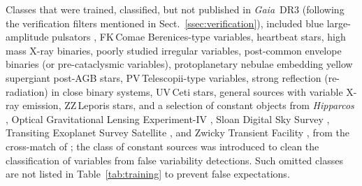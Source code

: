 \documentclass[longauth]{aa}
\def\gdr3{\textit{Gaia}~DR3\xspace}
\begin{document}
Classes that were trained, classified, but not published in \gdr3 (following the verification filters mentioned in Sect.~\ref{ssec:verification}), included blue large-amplitude pulsators \citep[BLAP,][]{2017NatAs...1E.166P}, FK\,Comae Berenices-type variables, heartbeat stars, high mass X-ray binaries, poorly studied irregular variables, post-common envelope binaries (or pre-cataclysmic variables), protoplanetary nebulae embedding yellow supergiant post-AGB stars, PV\,Telescopii-type variables, strong reflection (re-radiation) in close binary systems, UV\,Ceti stars, general sources with variable X-ray emission, ZZ\,Leporis stars, and a selection of constant objects from \textit{Hipparcos} \citep{1997ESASP1200.....E}, Optical Gravitational Lensing Experiment-IV \citep[OGLE-IV;][]{2012AcA....62..219S}, Sloan Digital Sky Survey \citep[SDSS;][]{2007AJ....134..973I}, Transiting Exoplanet Survey Satellite \citep[TESS;][]{2015JATIS...1a4003R}, and Zwicky Transient Facility \citep[ZTF;][]{2014htu..conf...27B}, from the cross-match of \citet{DR3-DPACP-177}; the class of constant sources was introduced to clean the classification of variables from false variability detections. 
Such omitted classes are not listed in Table~\ref{tab:training} to prevent false expectations.
\end{document}

